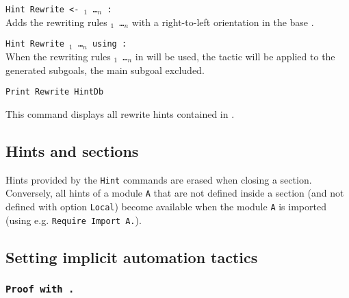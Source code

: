 \begin{coq_example*}
\begin{Variants}
\item {\tt Hint Rewrite <- \term$_1$ \dots \term$_n$ : \ident}\\
Adds the rewriting rules {\tt \term$_1$ \dots \term$_n$} with a right-to-left
orientation in the base {\tt \ident}.

\item {\tt Hint Rewrite \term$_1$ \dots \term$_n$ using {\tac} : {\ident}}\\
When the rewriting rules {\tt \term$_1$ \dots \term$_n$} in {\tt \ident} will
be used, the tactic {\tt \tac} will be applied to the generated subgoals, the
main subgoal excluded.


\item \texttt{Print Rewrite HintDb {\ident}}

  This command displays all rewrite hints contained in {\ident}.

\end{Variants}

\subsection{Hints and sections
\label{Hint-and-Section}}

Hints provided by the \texttt{Hint} commands are erased when closing a
section. Conversely, all hints of a module \texttt{A} that are not
defined inside a section (and not defined with option {\tt Local}) become
available when the module {\tt A} is imported (using
e.g. \texttt{Require Import A.}).

\subsection{Setting implicit automation tactics}

\subsubsection[\tt Proof with {\tac}.]{\tt Proof with {\tac}.\label{ProofWith}
}


\end{coq_example*}
